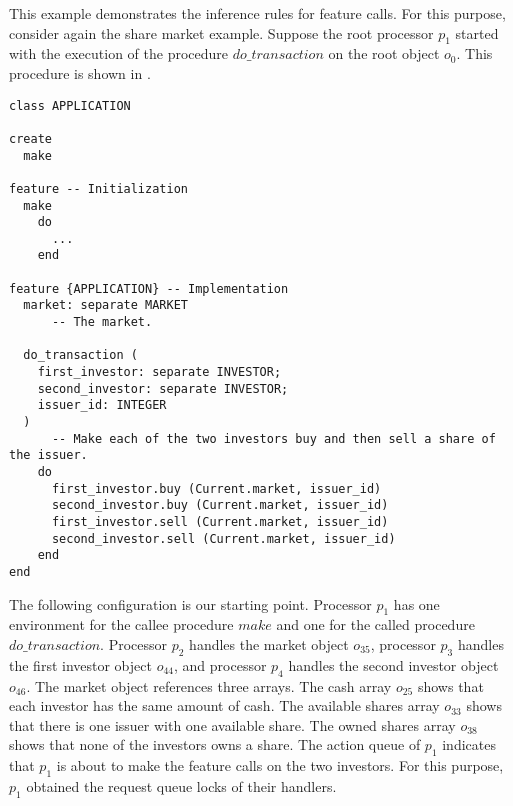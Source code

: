 \begin{fortechnicalreport}
\begin{example}
This example demonstrates the inference rules for feature calls. For this purpose, consider again the share market example. Suppose the root processor $p_{1}$ started with the execution of the procedure $do\_transaction$ on the root object $o_{0}$. This procedure is shown in .

\begin{lstlisting}[caption=Application class with implementation, label=lst:application class with implementation, language=SCOOP, escapechar=\%]
class APPLICATION

create
  make

feature -- Initialization
  make
    do
      ...
    end

feature {APPLICATION} -- Implementation
  market: separate MARKET
      -- The market.
			
  do_transaction (
    first_investor: separate INVESTOR;
    second_investor: separate INVESTOR;
    issuer_id: INTEGER
  )
      -- Make each of the two investors buy and then sell a share of the issuer.
    do
      first_investor.buy (Current.market, issuer_id)
      second_investor.buy (Current.market, issuer_id)
      first_investor.sell (Current.market, issuer_id)
      second_investor.sell (Current.market, issuer_id)
    end
end
\end{lstlisting}

The following configuration is our starting point. Processor $p_{1}$ has one environment for the callee procedure $make$ and one for the called procedure $do\_transaction$. Processor $p_{2}$ handles the market object $o_{35}$, processor $p_{3}$ handles the first investor object $o_{44}$, and processor $p_{4}$ handles the second investor object $o_{46}$. The market object references three arrays. The cash array $o_{25}$ shows that each investor has the same amount of cash. The available shares array $o_{33}$ shows that there is one issuer with one available share. The owned shares array $o_{38}$ shows that none of the investors owns a share. The action queue of $p_{1}$ indicates that $p_{1}$ is about to make the feature calls on the two investors. For this purpose, $p_{1}$ obtained the request queue locks of their handlers.


\end{example}
\end{fortechnicalreport}
